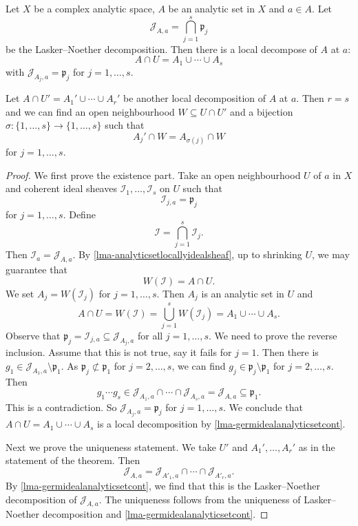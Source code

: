 \begin{proposition}\label{prop-primedecunique}
    Let $X$ be a complex analytic space, $A$ be an analytic set in $X$ and $a\in A$. 
    Let 
    \[
        \mathcal{J}_{A,a}=\bigcap_{j=1}^s \mathfrak{p}_j
    \]
    be the Lasker--Noether decomposition. Then there is a local decompose of $A$ at $a$:
    \[
        A\cap U=A_1  \cup\cdots\cup A_s
    \] 
    with $\mathcal{J}_{A_j,a}=\mathfrak{p}_j$ for $j=1,\ldots,s$.

    Let $A\cap U'=A_1'\cup\cdots\cup A_r'$ be another local decomposition of $A$ at $a$. Then $r=s$ and we can find an open neighbourhood $W\subseteq U\cap U'$ and a bijection $\sigma:\{1,\ldots,s\}\rightarrow \{1,\ldots,s\}$ such that 
    \[
        A_j'\cap W=A_{\sigma(j)}\cap W  
    \]
    for $j=1,\ldots,s$.
\end{proposition}

\begin{proof}
    We first prove the existence part. Take an open neighbourhood $U$ of $a$ in $X$ and coherent ideal sheaves $\mathcal{I}_1,\ldots,\mathcal{I}_s$ on $U$ such that 
    \[
        \mathcal{I}_{j,a}=\mathfrak{p}_j  
    \]
    for $j=1,\ldots,s$. Define
    \[
        \mathcal{I}=\bigcap_{j=1}^s\mathcal{I}_{j}.
    \]
    Then $\mathcal{I}_a=\mathcal{J}_{A,a}$. By \cref{lma-analyticsetlocallyidealsheaf}, up to shrinking $U$, we may guarantee that 
    \[
        W(\mathcal{I})=A\cap U.  
    \]
    We set $A_j=W(\mathcal{I}_j)$ for $j=1,\ldots,s$. Then $A_j$ is an analytic set in $U$ and 
    \[
        A\cap U=W(\mathcal{I})=\bigcup_{j=1}^s W(\mathcal{I}_j)=A_1\cup\cdots\cup A_s. 
    \]
    Observe that $\mathfrak{p}_j=\mathcal{I}_{j,a}\subseteq \mathcal{J}_{A_j,a}$ for all $j=1,\ldots,s$. We need to prove the reverse inclusion. Assume that this is not true, say it fails for $j=1$.
    Then there is $g_1\in \mathcal{J}_{A_1,a}\setminus \mathfrak{p}_1$. As $\mathfrak{p}_j\not\subset \mathfrak{p}_1$ for $j=2,\ldots,s$, we can find $g_j\in \mathfrak{p}_j\setminus \mathfrak{p}_1$ for $j=2,\ldots,s$. Then
    \[
        g_1\cdots g_s\in \mathcal{J}_{A_1,a}\cap  \cdots \cap \mathcal{J}_{A_s,a}=\mathcal{J}_{A,a}\subseteq \mathfrak{p}_1. 
    \]
    This is a contradiction. So $\mathcal{J}_{A_j,a}=\mathfrak{p}_j$ for $j=1,\ldots,s$. We conclude that $A\cap U=A_1  \cup\cdots\cup A_s$ is a local decomposition by \cref{lma-germidealanalyticsetcont}.

    Next we prove the uniqueness statement. We take $U'$ and $A_1',\ldots,A_r'$ as in the statement of the theorem. Then
    \[
        \mathcal{J}_{A,a}=\mathcal{J}_{A'_1,a}\cap \cdots \cap   \mathcal{J}_{A'_r,a}.
    \]
    By \cref{lma-germidealanalyticsetcont}, we find that this is the Lasker--Noether decomposition of $\mathcal{J}_{A,a}$. The uniqueness follows from the uniqueness of Lasker--Noether decomposition and \cref{lma-germidealanalyticsetcont}.
\end{proof}

